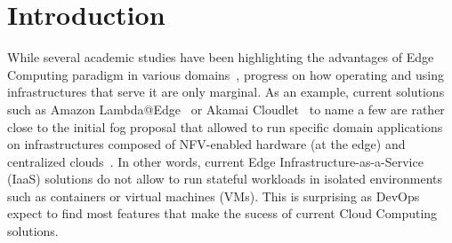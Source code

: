 \section{Introduction}
\label{sec:intro}



While several academic studies have been highlighting the advantages
of Edge Computing paradigm in various
domains~\cite{bonomi2012fog,zhang2015cloud,yi2015fog,shi2016edge,satyanarayanan2017emergence},
progress on how operating and using infrastructures that serve it are
only marginal.  As an example, current solutions such as Amazon
Lambda@Edge~\cite{amazon:lambda-edge} or Akamai
Cloudlet~\cite{akamai:cloudlets} to name a few are rather close to the
initial fog proposal that allowed to run specific domain applications
on infrastructures composed of NFV-enabled hardware (at the edge) and
centralized clouds~\cite{bonomi2012fog}.  In other words, current Edge
Infrastructure-as-a-Service (IaaS) solutions do not allow to run stateful
workloads in isolated environments such as containers or virtual
machines (VMs).
%
This is surprising as DevOps expect to find most features that make the sucess of
current Cloud Computing solutions.




